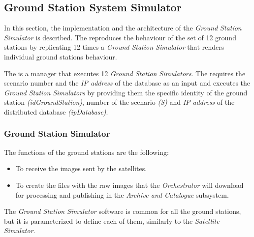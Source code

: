 \subsection{Ground Station System Simulator}

In this section, the implementation and the architecture of the \emph{Ground Station Simulator} is described. The \gsss reproduces the behaviour of the set of 12 ground stations by replicating 12 times a \emph{Ground Station Simulator} that renders individual ground stations behaviour.

The \gsss is a manager that executes 12 \emph{Ground Station Simulators}. The
\gsss requires the scenario number and the \emph{IP address} of the database as
an input and executes the \emph{Ground Station  Simulators} by providing them
the specific identity of the ground station \emph{(idGroundStation)}, number of
the scenario \emph{(S)} and \emph{IP address} of the distributed database
\emph{(ipDatabase)}.

\subsubsection{Ground Station Simulator}

The functions of the ground stations are the following:
\begin{itemize}
\item To receive the images sent by the satellites.
\item To create the files with the raw images that the \emph{Orchestrator} will
  download for processing and publishing in the \emph{Archive and Catalogue} subsystem.
\end{itemize}

The \emph{Ground Station Simulator} software is common for all the ground stations, but it is parameterized to define each of them, similarly to the \emph{Satellite Simulator}.

